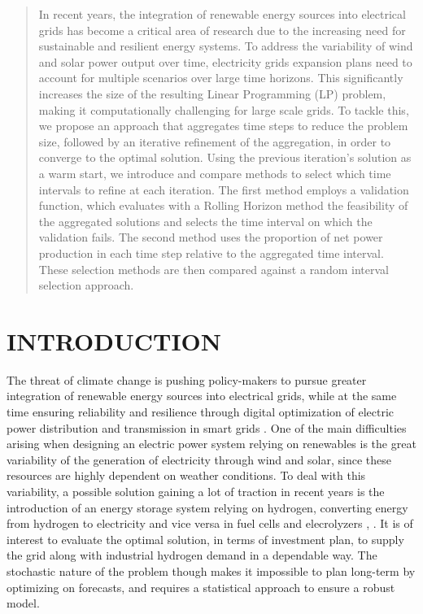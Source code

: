 \documentclass[smallextended,natbib]{svjour3}       %
\numberwithin{theorem}{section}
\begin{document}
\begin{abstract}
  In recent years, the integration of renewable energy sources into electrical grids has become a critical area of research due to the increasing need for sustainable and resilient energy systems. 
  To address the variability of wind and solar power output over time, electricity grids expansion plans need to account for multiple scenarios over large time horizons.
  This significantly increases the size of the resulting Linear Programming (LP) problem, making it computationally challenging for large scale grids. 
  To tackle this, we propose an approach that aggregates time steps to reduce the problem size, followed by an iterative refinement of the aggregation, in order to converge to the optimal solution.
  Using the previous iteration's solution as a warm start, we introduce and compare methods to select which time intervals to refine at each iteration.
  The first method employs a validation function, which evaluates with a Rolling Horizon method the feasibility of the aggregated solutions and selects the time interval on which the validation fails. 
  The second method uses the proportion of net power production in each time step relative to the aggregated time interval. 
  These selection methods are then compared against a random interval selection approach. 


\end{abstract}



\newpage
\section{INTRODUCTION}


The threat of climate change is pushing policy-makers to pursue greater integration of renewable energy sources into
 electrical grids, while at the same time ensuring reliability and resilience through digital optimization of electric 
 power distribution and transmission in smart grids \citep{EU_context}. 
One of the main difficulties arising when designing an electric power system relying on renewables is the great variability
 of the generation of electricity through wind and solar, since these resources are highly dependent on weather conditions. 
To deal with this variability, a possible solution gaining a lot of traction in recent years is the introduction of an energy
 storage system relying on hydrogen, converting energy from hydrogen to electricity and vice versa in fuel cells and 
 elecrolyzers \citep{INTRO_blanco}, \citep{INTRO_parra}. 
It is of interest to evaluate the optimal solution, in terms of investment plan, to supply the grid along with industrial
 hydrogen demand in a dependable way. 
The stochastic nature of the problem though makes it impossible to plan long-term by optimizing on forecasts, and requires
 a statistical approach to ensure a robust model.
\end{document}
